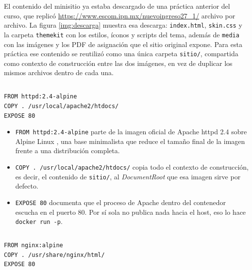 \documentclass[10pt,a4paper]{article}
\begin{document}
El contenido del minisitio ya estaba descargado de una práctica anterior del curso, que replicó \url{https://www.escom.ipn.mx/nuevoingreso27_1/} archivo por archivo. La figura \ref{img:descarga} muestra esa descarga: \texttt{index.html}, \texttt{skin.css} y la carpeta \texttt{themekit} con los estilos, íconos y scripts del tema, además de \texttt{media} con las imágenes y los PDF de asignación que el sitio original expone. Para esta práctica ese contenido se reutilizó como una única carpeta \texttt{sitio/}, compartida como contexto de construcción entre las dos imágenes, en vez de duplicar los mismos archivos dentro de cada una.

\subsection{ \color{colorESCOM}{Dockerfile de Apache}}

\begin{lstlisting}[language=bash,caption={Dockerfile.apache}, label={lst:dockerfileapache}]
FROM httpd:2.4-alpine
COPY . /usr/local/apache2/htdocs/
EXPOSE 80
\end{lstlisting}

\begin{itemize}
	\item \texttt{FROM httpd:2.4-alpine} parte de la imagen oficial de Apache httpd 2.4 sobre Alpine Linux \cite{apache2024docker}, una base minimalista que reduce el tamaño final de la imagen frente a una distribución completa.
	\item \texttt{COPY . /usr/local/apache2/htdocs/} copia todo el contexto de construcción, es decir, el contenido de \texttt{sitio/}, al \textit{DocumentRoot} que esa imagen sirve por defecto.
	\item \texttt{EXPOSE 80} documenta que el proceso de Apache dentro del contenedor escucha en el puerto 80. Por sí sola no publica nada hacia el host, eso lo hace \texttt{docker run -p}.
\end{itemize}

\subsection{ \color{colorESCOM}{Dockerfile de Nginx}}

\begin{lstlisting}[language=bash,caption={Dockerfile.nginx}, label={lst:dockerfilenginx}]
FROM nginx:alpine
COPY . /usr/share/nginx/html/
EXPOSE 80
\end{lstlisting}
\end{document}

